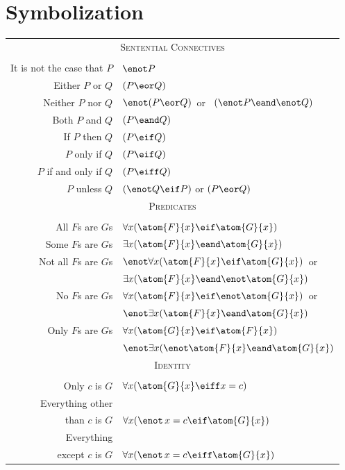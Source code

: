 \section{Symbolization}
\begin{center}
\label{app.symbolization}
\begin{tabular*}{\textwidth}{rl}
\multicolumn{2}{c}{\textsc{Sentential Connectives}}\\ \\
It is not the case that $P$ & $\enot P$\\
Either $P$ or $Q$ & $(P \eor Q)$\\
Neither $P$ nor $Q$ & $\enot(P \eor Q)$\ or \ $(\enot P \eand \enot Q)$\\
Both $P$ and $Q$ & $(P \eand Q)$\\
If $P$ then $Q$ & $(P \eif Q)$\\
$P$ only if $Q$ & $(P \eif Q)$\\
$P$ if and only if $Q$ & $(P \eiff Q)$\\
$P$ unless $Q$ & $(\enot Q \eif P)$ or $(P \eor Q)$\\[12pt]
\multicolumn{2}{c}{\label{SymbolizingPredicates}\textsc{Predicates}}\\ \\
All $F$s are $G$s & $\forall x(\atom{F}{x} \eif \atom{G}{x})$\\
Some $F$s are $G$s & $\exists x(\atom{F}{x} \eand \atom{G}{x})$\\
Not all $F$s are $G$s & $\enot\forall x(\atom{F}{x} \eif \atom{G}{x})$\ or\\
& $\exists x(\atom{F}{x} \eand \enot \atom{G}{x})$\\
No $F$s are $G$s & $\forall x(\atom{F}{x} \eif\enot \atom{G}{x})$\ or\\
& $\enot\exists x(\atom{F}{x} \eand \atom{G}{x})$\\
Only $F$s are $G$s & $\forall x(\atom{G}{x} \eif \atom{F}{x})$\\
& $\enot\exists x(\enot\atom{F}{x} \eand \atom{G}{x})$\\[12pt]
\multicolumn{2}{c}{\textsc{Identity}}\\ \\
Only $c$ is $G$ & $\forall x(\atom{G}{x} \eiff x=c)$\\
Everything other &\\ than $c$ 
is $G$ & $\forall x(\enot\, {x = c} \eif \atom{G}{x} )$\\
Everything \\except $c$ 
 is $G$ & $\forall x(\enot\, {x = c} \eiff \atom{G}{x} )$\\

\end{tabular*}
\end{center}
